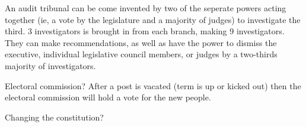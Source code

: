 \documentclass[a4paper]{report}
\begin{document}
An audit tribunal can be come invented by two of the seperate powers acting together (ie, a vote by the legislature and a majority of judges) to investigate the third. 3 investigators is brought in from each branch, making 9 investigators. They can make recommendations, as well as have the power to dismiss the executive, individual legislative council members, or judges by a two-thirds majority of investigators.

Electoral commission? After a post is vacated (term is up or kicked out) then the electoral commission will hold a vote for the new people.

Changing the constitution?
\end{document}
